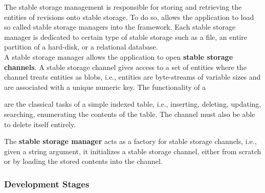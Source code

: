 \documentclass[a4paper, 10pt]{book}
\begin{document}
                                The stable storage management is responsible for storing and
                                retrieving the entities of revisions onto stable storage. To do so,
                                \SYNEIGHT allows the application to load so called stable storage managers
                                into the framework. Each stable storage manager is dedicated to
                                certain type of stable storage such as a file, an entire partition of
                                a hard-disk, or a relational database.\\
                                A stable storage manager allows the application to open \textbf{stable
                                storage channels}. A stable storage channel gives \SYNEIGHT access to a
                                set of entities where the channel treats entities as blobs, i.e.,
                                entities are byte-streams of variable sizes and are associated with a
                                unique numeric key.
                                The functionality of a
                                \begin{description}
                                    \item[stable storage channel] are the classical tasks of a simple
                                        indexed table, i.e., inserting, deleting, updating, searching,
                                        enumerating the contents of the table. The channel must also be able
                                        to delete itself entirely. 
                                    \item The \textbf{stable storage manager} acts as a factory for
                                        stable storage channels, i.e., given a string argument, it
                                        initializes a stable storage channel, either from scratch or by
                                        loading the stored contents into the channel.  
                                \end{description}

                                \subsubsection{Development Stages}
                                \label{sec:development-stages-1}
\end{document}
